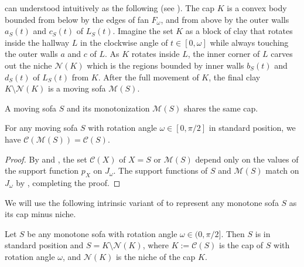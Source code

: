 \begin{remark}

 can understood intuitively as the following (see ). The cap \(K\) is a convex body bounded from below by the edges of fan \(F_\omega\), and from above by the outer walls \(a_S(t)\) and \(c_S(t)\) of \(L_S(t)\). Imagine the set \(K\) as a block of clay that rotates inside the hallway \(L\) in the clockwise angle of \(t \in [0, \omega]\) while always touching the outer walls \(a\) and \(c\) of \(L\). As \(K\) rotates inside \(L\), the inner corner of \(L\) carves out the niche \(\mathcal{N}(K)\) which is the regions bounded by inner walls \(b_S(t)\) and \(d_S(t)\) of \(L_S(t)\) from \(K\). After the full movement of \(K\), the final clay \(K \setminus \mathcal{N}(K)\) is a moving sofa \(\mathcal{M}(S)\).

\label{rem:cap-niche-intuition}
\end{remark}

A moving sofa \(S\) and its monotonization \(\mathcal{M}(S)\) shares the same cap.

\begin{proposition}

For any moving sofa \(S\) with rotation angle \(\omega \in [0, \pi/2]\) in standard position, we have \(\mathcal{C}(\mathcal{M}(S)) = \mathcal{C}(S)\).

\label{pro:monotonization-cap}
\end{proposition}

\begin{proof}
By  and , the set \(\mathcal{C}(X)\) of \(X = S\) or \(\mathcal{M}(S)\) depend only on the values of the support function \(p_X\) on \(J_\omega\). The support functions of \(S\) and \(\mathcal{M}(S)\) match on \(J_\omega\) by , completing the proof.
\end{proof}

We will use the following intrinsic variant of  to represent any monotone sofa \(S\) as its cap minus niche.

\begin{theorem}

Let \(S\) be any monotone sofa with rotation angle \(\omega \in (0, \pi/2]\). Then \(S\) is in standard position and \(S = K \setminus \mathcal{N}(K)\), where \(K := \mathcal{C}(S)\) is the cap of \(S\) with rotation angle \(\omega\), and \(\mathcal{N}(K)\) is the niche of the cap \(K\).

\label{thm:monotone-sofa-structure}
\end{theorem}

